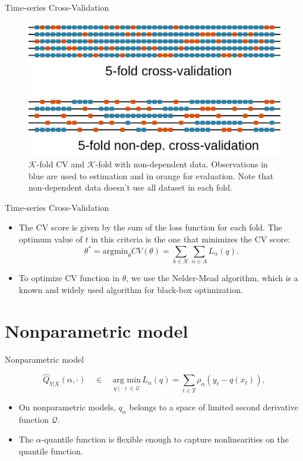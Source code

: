 \documentclass[11pt]{beamer}
\begin{document}
\begin{frame}{Time-series Cross-Validation}

\begin{figure}
\centering
\includegraphics[width=0.9\linewidth]{Images/Cross-validation-scheme}
\caption{$\mathcal{K}$-fold CV and $\mathcal{K}$-fold with non-dependent data. Observations in blue are used to estimation and in orange for evaluation. Note that non-dependent data doesn't use all dataset in each fold.}
\label{fig:cross-validation-scheme}
\end{figure}

\end{frame}

\begin{frame}{Time-series Cross-Validation}

\begin{itemize}

\item
The CV score is given by the sum of the loss function for each fold.
The optimum value of \(t\) in this criteria is the one that minimizes
the CV score: \[
\theta^* = \text{argmin}_\theta CV(\theta) = \sum_{k \in \mathcal{K}} \sum_{\alpha \in A} L_\alpha(q).
\]
\item
To optimize CV function in \(\theta\), we use the Nelder-Mead
algorithm, which is a known and widely used algorithm for black-box
optimization.
\end{itemize}

\end{frame}

\section{Nonparametric model}\label{nonparametric-model}

\begin{frame}{Nonparametric model}

\[
\hat{Q}_{Y|X}(\alpha,\cdot)\quad\in\quad  \underset{q(\cdot)\in\mathcal{Q}}{\text{arg min}}\, L_\alpha(q) = \sum_{t\in T}\rho_{\alpha}(y_{t}-q(x_t)),
\]

\begin{itemize}
\item
On nonparametric models, \(q_\alpha\) belongs to a space of limited
second derivative function \(\mathcal{Q}\).
\item
The \(\alpha\)-quantile function is flexible enough to capture
nonlinearities on the quantile function.
\end{itemize}

\end{frame}
\end{document}
